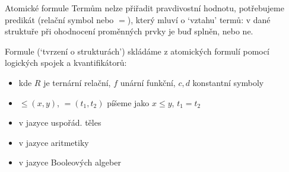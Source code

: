 \documentclass{beamer}
\begin{document}
\begin{frame}{Atomické formule}
    Termům nelze přiřadit \alert{pravdivostní hodnotu}, potřebujeme \alert{predikát} (relační symbol nebo $=$), který mluví \alert{o `vztahu' termů}: v dané struktuře při ohodnocení proměnných prvky je buď splněn, nebo ne.

    \medskip

    \alert{Formule} (`tvrzení o strukturách') skládáme z \alert{atomických formulí} pomocí  logických spojek a kvantifikátorů:  

    \medskip


    \medskip

    \begin{itemize}
        \item {} kde $R$ je ternární relační, $f$ unární funkční, $c,d$ konstantní symboly
            \item {} $\leq(x,y)$, $=(t_1,t_2)$ píšeme jako $x\leq y$, $t_1=t_2$
        \item {} v jazyce uspořád. těles
        \item {} v jazyce aritmetiky
        \item {} v jazyce Booleových algeber        
    \end{itemize} 
    
\end{frame}
\end{document}
